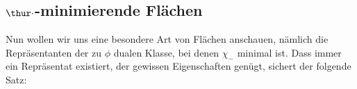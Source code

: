 
    


\subsection{$\thur \cdot$-minimierende Flächen}
    
Nun wollen wir uns eine besondere Art von Flächen anschauen, nämlich die Repräsentanten der zu $\phi$ dualen Klasse, bei denen $\chi_-$ minimal ist. Dass immer ein Repräsentat existiert, der gewissen Eigenschaften genügt, sichert der folgende Satz:

